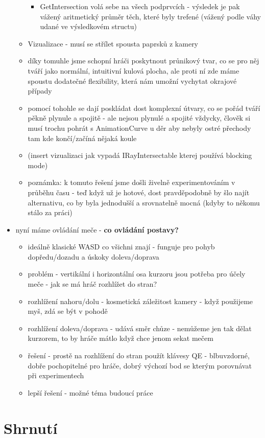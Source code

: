 \begin{itemize}
\begin{itemize}
\begin{itemize}
                    \item GetIntersection volá sebe na všech podprvcích - výsledek je pak vážený aritmetický průměr těch, které byly trefené (vážený podle váhy udané ve výsledkovém structu)
                \end{itemize}
            \item Vizualizace - musí se střílet spousta paprsků z kamery 
            \item díky tomuhle jsme schopní hráči poskytnout průnikový tvar, co se pro něj tváří jako normální, intuitivní kulová plocha, ale proti ní zde máme spoustu dodatečné flexibility, která nám umožní vychytat okrajové případy
            \item pomocí tohohle se dají poskládat dost komplexní útvary, co se pořád tváří pěkně plynule a spojitě - ale nejsou plynulé a spojité vždycky, člověk si musí trochu pohrát s AnimationCurve u děr aby nebyly ostré přechody tam kde končí/začíná nějaká koule
            \item (insert vizualizaci jak vypadá IRayIntersectable kterej používá blocking mode)
            \item poznámka: k tomuto řešení jsme došli živelně experimentováním v průběhu času - teď když už je hotové, dost pravděpodobně by šlo najít alternativu, co by byla jednodušší a srovnatelně mocná (kdyby to někomu stálo za práci)
        \end{itemize}
    \item nyní máme ovládání meče - \textbf{co ovládání postavy?}
        \begin{itemize}
            \item ideálně klasické WASD co všichni znají - funguje pro pohyb dopředu/dozadu a úskoky doleva/doprava
            \item problém - vertikální i horizontální osa kurzoru jsou potřeba pro účely meče - jak se má hráč rozhlížet do stran?
            \item rozhlížení nahoru/dolu - kosmetická záležitost kamery - když použijeme myš, zdá se být v pohodě
            \item rozhlížení doleva/doprava - udává směr chůze - nemůžeme jen tak dělat kurzorem, to by hráče mátlo když chce jenom sekat mečem 
            \item řešení - prostě na rozhlížení do stran použít klávesy QE - blbuvzdorné, dobře pochopitelné pro hráče, dobrý výchozí bod se kterým porovnávat při experimentech
            \item lepší řešení - možné téma budoucí práce
        \end{itemize}
\end{itemize}

\section{Shrnutí}

